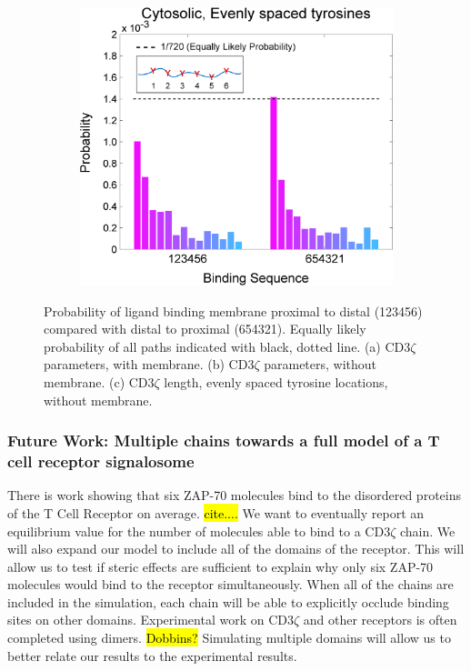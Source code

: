 \documentclass[../../AdvancementSummary.tex]{subfiles}
\begin{document}
\begin{figure}[H]
\begin{center}
\begin{subfigure}{0.3\linewidth}
			\caption{}
		\end{subfigure}
		\begin{subfigure}{0.3\linewidth}
			\includegraphics[width=\linewidth]{ResultsFigures/MultipleSequentialBinding/EvenSites/ProbVSSequence.eps}
			\caption{}
		\end{subfigure}
	\end{center}
	\caption{Probability of ligand binding membrane proximal to distal (123456) compared with distal to proximal (654321). Equally likely probability of all paths indicated with black, dotted line. (a) CD3$\zeta$ parameters, with membrane. (b) CD3$\zeta$ parameters, without membrane. (c) CD3$\zeta$ length, evenly spaced tyrosine locations, without membrane.}
\end{figure}

\subsubsection{Future Work: Multiple chains towards a full model of a T cell receptor signalosome}

There is work showing that six ZAP-70 molecules bind to the disordered proteins of the T Cell Receptor on average.  \hl{cite....} We want to eventually report an equilibrium value for the number of molecules able to bind to a CD3$\zeta$ chain. We will also expand our model to include all of the domains of the receptor. This will allow us to test if steric effects are sufficient to explain why only six ZAP-70 molecules would bind to the receptor simultaneously.  When all of the chains are included in the simulation, each chain will be able to explicitly occlude binding sites on other domains. Experimental work on CD3$\zeta$ and other receptors is often completed using dimers. \cite{Mukhopadhyay2016} \hl{Dobbins?} Simulating multiple domains will allow us to better relate our results to the experimental results. 
\end{document}

